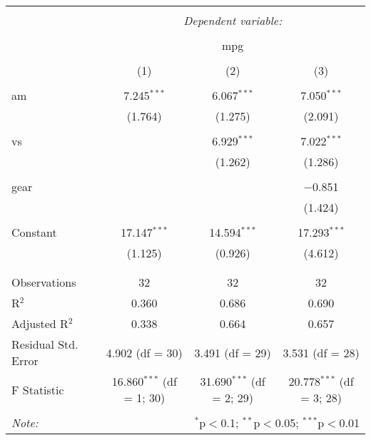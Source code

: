 
\begin{table}[!htbp] \centering 
  \caption{} 
  \label{} 
\begin{tabular}{@{\extracolsep{5pt}}lccc} 
\\[-1.8ex]\hline 
\hline \\[-1.8ex] 
 & \multicolumn{3}{c}{\textit{Dependent variable:}} \\ 
\cline{2-4} 
\\[-1.8ex] & \multicolumn{3}{c}{mpg} \\ 
\\[-1.8ex] & (1) & (2) & (3)\\ 
\hline \\[-1.8ex] 
 am & 7.245$^{***}$ & 6.067$^{***}$ & 7.050$^{***}$ \\ 
  & (1.764) & (1.275) & (2.091) \\ 
  & & & \\ 
 vs &  & 6.929$^{***}$ & 7.022$^{***}$ \\ 
  &  & (1.262) & (1.286) \\ 
  & & & \\ 
 gear &  &  & $-$0.851 \\ 
  &  &  & (1.424) \\ 
  & & & \\ 
 Constant & 17.147$^{***}$ & 14.594$^{***}$ & 17.293$^{***}$ \\ 
  & (1.125) & (0.926) & (4.612) \\ 
  & & & \\ 
\hline \\[-1.8ex] 
Observations & 32 & 32 & 32 \\ 
R$^{2}$ & 0.360 & 0.686 & 0.690 \\ 
Adjusted R$^{2}$ & 0.338 & 0.664 & 0.657 \\ 
Residual Std. Error & 4.902 (df = 30) & 3.491 (df = 29) & 3.531 (df = 28) \\ 
F Statistic & 16.860$^{***}$ (df = 1; 30) & 31.690$^{***}$ (df = 2; 29) & 20.778$^{***}$ (df = 3; 28) \\ 
\hline 
\hline \\[-1.8ex] 
\textit{Note:}  & \multicolumn{3}{r}{$^{*}$p$<$0.1; $^{**}$p$<$0.05; $^{***}$p$<$0.01} \\ 
\end{tabular} 
\end{table} 
